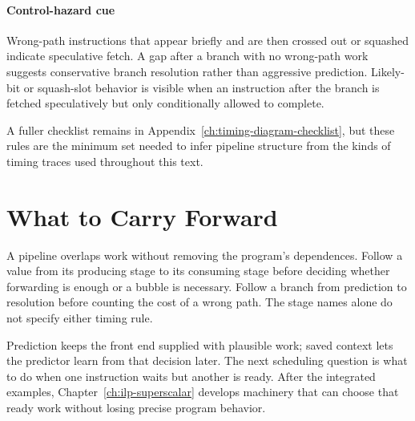 \paragraph{Control-hazard cue}\label{par:auto-025d}
Wrong-path instructions that appear briefly and are then crossed out or squashed indicate speculative fetch.
A gap after a branch with no wrong-path work suggests conservative branch resolution rather than aggressive prediction.
Likely-bit or squash-slot behavior is visible when an instruction after the branch is fetched speculatively but only conditionally allowed to complete.

A fuller checklist remains in Appendix~\ref{ch:timing-diagram-checklist}, but these rules are the minimum set needed to infer pipeline structure from the kinds of timing traces used throughout this text.


\section{What to Carry Forward}\label{sec:auto-045}
A pipeline overlaps work without removing the program's dependences.
Follow a value from its producing stage to its consuming stage before deciding whether forwarding is enough or a bubble is necessary.
Follow a branch from prediction to resolution before counting the cost of a wrong path.
The stage names alone do not specify either timing rule.

Prediction keeps the front end supplied with plausible work; saved context lets the predictor learn from that decision later.
The next scheduling question is what to do when one instruction waits but another is ready.
After the integrated examples, Chapter~\ref{ch:ilp-superscalar} develops machinery that can choose that ready work without losing precise program behavior.



